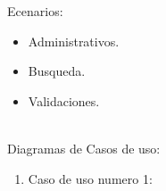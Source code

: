 \documentclass[12pt]{article}
\begin{document}
Ecenarios:
\begin{itemize}
\item  
Administrativos.
\item
Busqueda.
\item
Validaciones.\\\\
\end{itemize}

Diagramas de Casos de uso:
\begin{enumerate}
\item 
 Caso de uso numero 1:\\
\begin{center}
\end{center}
\pagebreak 


\end{enumerate}
\end{document}
